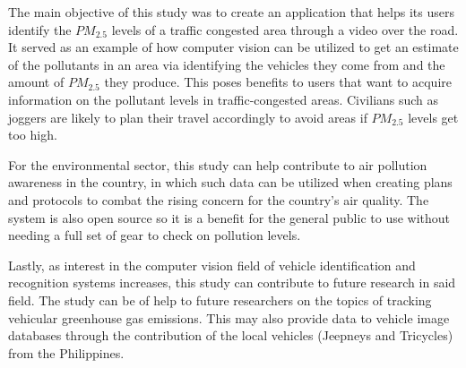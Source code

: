 The main objective of this study was to create an application that helps its users identify the $PM_{2.5}$ levels of a traffic congested area through a video over the road. It served as an example of how computer vision can be utilized to get an estimate of the pollutants in an area via identifying the vehicles they come from and the amount of $PM_{2.5}$ they produce. This poses benefits to users that want to acquire information on the pollutant levels in traffic-congested areas. Civilians such as joggers are likely to plan their travel accordingly to avoid areas if $PM_{2.5}$ levels get too high.

For the environmental sector, this study can help contribute to air pollution awareness in the country, in which such data can be utilized when creating plans and protocols to combat the rising concern for the country’s air quality. The system is also open source so it is a benefit for the general public to use without needing a full set of gear to check on pollution levels.

Lastly, as interest in the computer vision field of vehicle identification and recognition systems increases, this study can contribute to future research in said field. The study can be of help to future researchers on the topics of tracking vehicular greenhouse gas emissions. This may also provide data to vehicle image databases through the contribution of the local vehicles (Jeepneys and Tricycles) from the Philippines.




\begin{comment}
If applicable, describe possible commercialization and/or innovation in your research.
\end{comment}


